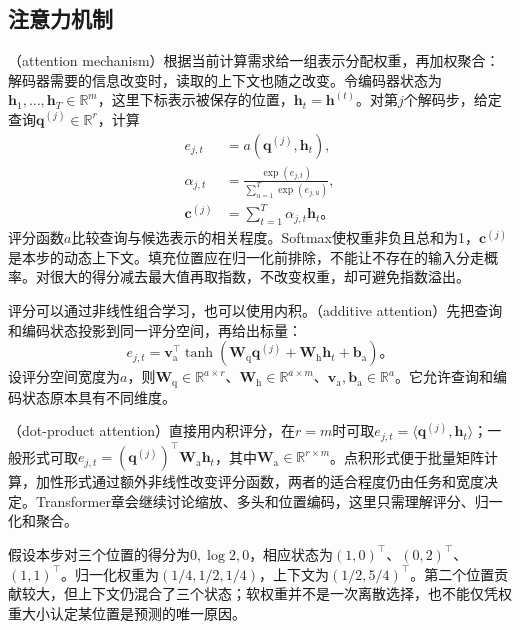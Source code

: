 \subsection{注意力机制}
\label{sec:rnn-attention-mechanism}

（attention mechanism）根据当前计算需求给一组表示分配权重，再加权聚合：解码器需要的信息改变时，读取的上下文也随之改变。令编码器状态为$\bm{h}_1,\ldots,\bm{h}_T\in\mathbb{R}^{m}$，这里下标表示被保存的位置，$\bm{h}_t=\bm{h}^{(t)}$。对第$j$个解码步，给定查询$\bm{q}^{(j)}\in\mathbb{R}^{r}$，计算
\begin{equation}
  \begin{aligned}
    e_{j,t}&=a(\bm{q}^{(j)},\bm{h}_t),\\
    \alpha_{j,t}&=\frac{\exp(e_{j,t})}
       {\sum_{u=1}^{T}\exp(e_{j,u})},\\
    \bm{c}^{(j)}&=\sum_{t=1}^{T}\alpha_{j,t}\bm{h}_t\text{。}
  \end{aligned}
  \label{eq:rnn-attention}
\end{equation}
评分函数$a$比较查询与候选表示的相关程度。Softmax使权重非负且总和为1，$\bm{c}^{(j)}$是本步的动态上下文。填充位置应在归一化前排除，不能让不存在的输入分走概率。对很大的得分减去最大值再取指数，不改变权重，却可避免指数溢出。

评分可以通过非线性组合学习，也可以使用内积。（additive attention）先把查询和编码状态投影到同一评分空间，再给出标量：
\begin{equation}
  e_{j,t}=\bm{v}_{\mathrm{a}}^{\top}\tanh\!\left(
     \bm{W}_{\mathrm{q}}\bm{q}^{(j)}
     +\bm{W}_{\mathrm{h}}\bm{h}_t+\bm{b}_{\mathrm{a}}\right)\text{。}
  \label{eq:rnn-additive-attention}
\end{equation}
设评分空间宽度为$a$，则$\bm{W}_{\mathrm{q}}\in\mathbb{R}^{a\times r}$、$\bm{W}_{\mathrm{h}}\in\mathbb{R}^{a\times m}$、$\bm{v}_{\mathrm{a}},\bm{b}_{\mathrm{a}}\in\mathbb{R}^{a}$。它允许查询和编码状态原本具有不同维度。

（dot-product attention）直接用内积评分，在$r=m$时可取$e_{j,t}=\langle\bm{q}^{(j)},\bm{h}_t\rangle$；一般形式可取$e_{j,t}=(\bm{q}^{(j)})^{\top}\bm{W}_{\mathrm{a}}\bm{h}_t$，其中$\bm{W}_{\mathrm{a}}\in\mathbb{R}^{r\times m}$。点积形式便于批量矩阵计算，加性形式通过额外非线性改变评分函数，两者的适合程度仍由任务和宽度决定。Transformer章会继续讨论缩放、多头和位置编码，这里只需理解评分、归一化和聚合。

\begin{example}[权重与上下文]
  \label{ex:rnn-attention-context}
  假设本步对三个位置的得分为$0,\log2,0$，相应状态为$(1,0)^{\top}$、$(0,2)^{\top}$、$(1,1)^{\top}$。归一化权重为$(1/4,1/2,1/4)$，上下文为$(1/2,5/4)^{\top}$。第二个位置贡献较大，但上下文仍混合了三个状态；软权重并不是一次离散选择，也不能仅凭权重大小认定某位置是预测的唯一原因。
\end{example}

